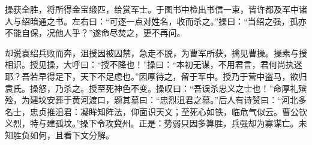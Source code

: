 操获全胜，将所得金宝缎匹，给赏军士。于图书中检出书信一束，皆许都及军中诸人与绍暗通之书。左右曰：“可逐一点对姓名，收而杀之。”操曰：“当绍之强，孤亦不能自保，况他人乎？”遂命尽焚之，更不再问。

却说袁绍兵败而奔，沮授因被囚禁，急走不脱，为曹军所获，擒见曹操。操素与授相识。授见操，大呼曰：“授不降也！”操曰：“本初无谋，不用君言，君何尚执迷耶？吾若早得足下，天下不足虑也。”因厚待之，留于军中。授乃于营中盗马，欲归袁氏。操怒，乃杀之。授至死神色不变。操叹曰：“吾误杀忠义之士也！”命厚礼殡殓，为建坟安葬于黄河渡口，题其墓曰：“忠烈沮君之墓。”后人有诗赞曰：“河北多名士，忠贞推沮君：凝眸知阵法，仰面识天文；至死心如铁，临危气似云。曹公钦义烈，特与建孤坟。”操下令攻冀州。正是：势弱只因多算胜，兵强却为寡谋亡。未知胜负如何，且看下文分解。